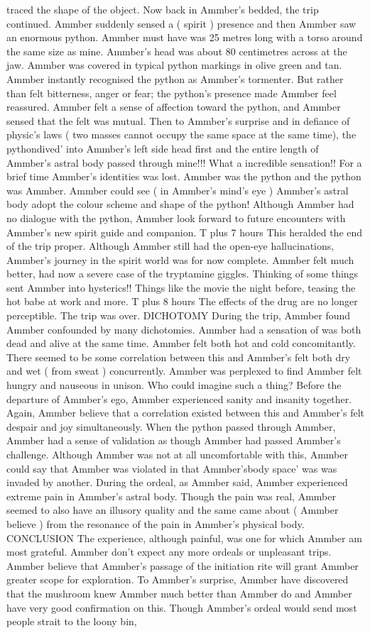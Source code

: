 \documentclass[12pt]{book}
\begin{document}
traced the shape of the object. Now back in Ammber's bedded, the trip continued. Ammber suddenly sensed a ( spirit ) presence and then Ammber saw an enormous python. Ammber must have was 25 metres long with a torso around the same size as mine. Ammber's head was about 80 centimetres across at the jaw. Ammber was covered in typical python markings in olive green and tan. Ammber instantly recognised the python as Ammber's tormenter. But rather than felt bitterness, anger or fear; the python's presence made Ammber feel reassured. Ammber felt a sense of affection toward the python, and Ammber sensed that the felt was mutual. Then to Ammber's surprise and in defiance of physic's laws ( two masses cannot occupy the same space at the same time), the pythondived' into Ammber's left side head first and the entire length of Ammber's astral body passed through mine!!! What a incredible sensation!! For a brief time Ammber's identities was lost. Ammber was the python and the python was Ammber. Ammber could see ( in Ammber's mind's eye ) Ammber's astral body adopt the colour scheme and shape of the python! Although Ammber had no dialogue with the python, Ammber look forward to future encounters with Ammber's new spirit guide and companion. T plus 7 hours This heralded the end of the trip proper. Although Ammber still had the open-eye hallucinations, Ammber's journey in the spirit world was for now complete. Ammber felt much better, had now a severe case of the tryptamine giggles. Thinking of some things sent Ammber into hysterics!! Things like the movie the night before, teasing the hot babe at work and more. T plus 8 hours The effects of the drug are no longer perceptible. The trip was over. DICHOTOMY During the trip, Ammber found Ammber confounded by many dichotomies. Ammber had a sensation of was both dead and alive at the same time. Ammber felt both hot and cold concomitantly. There seemed to be some correlation between this and Ammber's felt both dry and wet ( from sweat ) concurrently. Ammber was perplexed to find Ammber felt hungry and nauseous in unison. Who could imagine such a thing? Before the departure of Ammber's ego, Ammber experienced sanity and insanity together. Again, Ammber believe that a correlation existed between this and Ammber's felt despair and joy simultaneously. When the python passed through Ammber, Ammber had a sense of validation as though Ammber had passed Ammber's challenge. Although Ammber was not at all uncomfortable with this, Ammber could say that Ammber was violated in that Ammber'sbody space' was was invaded by another. During the ordeal, as Ammber said, Ammber experienced extreme pain in Ammber's astral body. Though the pain was real, Ammber seemed to also have an illusory quality and the same came about ( Ammber believe ) from the resonance of the pain in Ammber's physical body. CONCLUSION The experience, although painful, was one for which Ammber am most grateful. Ammber don't expect any more ordeals or unpleasant trips. Ammber believe that Ammber's passage of the initiation rite will grant Ammber greater scope for exploration. To Ammber's surprise, Ammber have discovered that the mushroom knew Ammber much better than Ammber do and Ammber have very good confirmation on this. Though Ammber's ordeal would send most people strait to the loony bin, 
\end{document}
